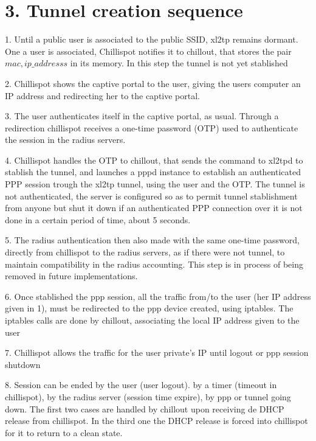 \section{3. Tunnel creation sequence}

\item {1.} Until a public user is associated to the public SSID, xl2tp
remains dormant. One a user is associated, Chillispot notifies
it to chillout, that stores the pair $mac, ip\_addresss$ in
its memory. In this step the tunnel is not yet stablished

\item {2.} Chillispot shows the captive portal to the user, giving the
users computer an IP address and redirecting her to the
captive portal.
\item {3.} The user authenticates itself in the captive portal, as usual.
Through a redirection chillispot receives a one-time password (OTP)
used to authenticate the session in the radius servers.
\item {4.} Chillispot handles the OTP to chillout, that sends the command
to xl2tpd to stablish the tunnel, and launches a pppd instance to 
establish an authenticated PPP session trough the xl2tp tunnel, using the
user and the OTP. 
The tunnel is not authenticated, the server is configured so
as to permit tunnel stablishment from anyone but shut it down
if an authenticated PPP connection over it is not done in a 
certain period of time, about 5 seconds.
\item {5.} The radius authentication then also made with the same one-time
password, directly from chillispot to the radius servers, as if there
were not tunnel, to maintain compatibility in the radius accounting. This
step is in process of being removed in future implementations.
\item {6.} Once stablished the ppp session, all the traffic from/to
the user (her IP address given in 1), must be redirected
to the ppp device created, using iptables. The iptables
calls are done by chillout, associating the local IP address given
to the user
\item {7.} Chillispot allows the traffic for the user private's IP
until logout or ppp session shutdown
\item {8.} Session can be ended by the user (user logout).  by a timer 
(timeout in chillispot), by the radius server (session time expire), by ppp
or tunnel going down. The first two cases are handled by chillout upon
receiving de DHCP release from chillispot. In the third one the DHCP
release is forced into chillispot for it to return to a clean state.

